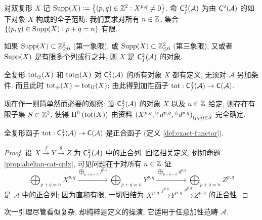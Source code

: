 \begin{definition}\label{def:Cf-Supp}
	对双复形 $X$ 记 $\operatorname{Supp}(X) := \left\{ (p,q) \in \mathbb{Z}^2 : X^{p,q} \neq 0 \right\}$. 命 $\mathsf{C}^2_f(\mathcal{A})$ 为由 $\mathsf{C}^2(\mathcal{A})$ 的如下对象 $X$ 构成的全子范畴: 我们要求对所有 $n \in \mathbb{Z}$, 集合 $\{ (p, q) \in \operatorname{Supp}(X): p + q = n \}$ 有限.
\end{definition}

\begin{example}
	如果 $\operatorname{Supp}(X) \subset \mathbb{Z}_{\geq 0}^2$ (第一象限), 或 $\operatorname{Supp}(X) \subset \mathbb{Z}_{\leq 0}^2$ (第三象限), 又或者 $\operatorname{Supp}(X)$ 是有限多个列或行之并, 则 $X$ 是 $\mathsf{C}^2_f(\mathcal{A})$ 的对象.
\end{example}

全复形 $\operatorname{tot}_{\oplus}(X)$ 和 $\operatorname{tot}_{\Pi}(X)$ 对 $\mathsf{C}^2_f(\mathcal{A})$ 的所有对象 $X$ 都有定义, 无须对 $\mathcal{A}$ 另加条件. 而且此时 $\operatorname{tot}_{\oplus}(X) = \operatorname{tot}_{\Pi}(X)$; 由此得到加性函子 $\operatorname{tot}: \mathsf{C}^2_f(\mathcal{A}) \to \mathsf{C}(\mathcal{A})$.

现在作一则简单然而必要的观察: 设 $\mathsf{C}^2_f(\mathcal{A})$ 的对象 $X$ 以及 $n \in \mathbb{Z}$ 给定, 则存在有限子集 $S \subset \mathbb{Z}^2$, 使得 $\operatorname{H}^n\left( \operatorname{tot}(X) \right)$ 由资料 $\left( X^{p,q}, {}^\vartriangleright d^{p, q} , {}^\vartriangle d^{p,q} \right)_{(p, q) \in S}$ 完全确定.

\begin{lemma}\label{prop:tot-exact}
	全复形函子 $\operatorname{tot}: \mathsf{C}^2_f(\mathcal{A}) \to \mathsf{C}(\mathcal{A})$ 是正合函子 (定义 \ref{def:exact-functor}).
\end{lemma}
\begin{proof}
	设 $X \xrightarrow{f} Y \xrightarrow{g} Z$ 为 $\mathsf{C}^2_f(\mathcal{A})$ 中的正合列. 回忆相关定义, 例如命题 \ref{prop:abelian-cat-cplx}, 可见问题在于对所有 $n \in \mathbb{Z}$ 证
	\[ \bigoplus_{p+q=n} X^{p,q} \xrightarrow{\bigoplus_{p+q=n} f^{p,q}} \bigoplus_{p+q=n} Y^{p,q} \xrightarrow{\bigoplus_{p+q=n} g^{p,q}} \bigoplus_{p+q=n} Z^{p,q} \]
	是 $\mathcal{A}$ 中的正合列; 因为直和有限, 一切归结为 $X^{p,q} \xrightarrow{f^{p,q}} Y^{p,q} \xrightarrow{g^{p,q}} Z^{p,q}$ 的正合性.
\end{proof}

次一引理尽管看似复杂, 却纯粹是定义的操演, 它适用于任意加性范畴 $\mathcal{A}$.

